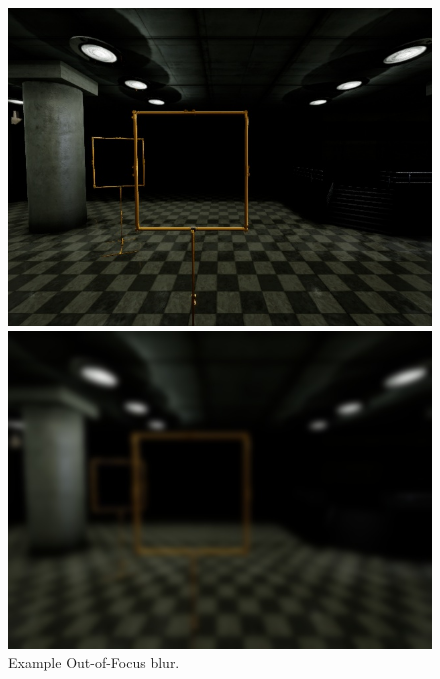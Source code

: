 \begin{figure}[htbp]
	\centering
	\begin{minipage}{0.49\textwidth}
		\includegraphics[width=\textwidth]{fig/gate_example}
	\end{minipage}
	\begin{minipage}{0.49\textwidth}
		\includegraphics[width=\textwidth]{fig/gate_example_focusblur}
	\end{minipage}
	\caption{Example Out-of-Focus blur.}
	\label{fig:focusblur}
\end{figure}

